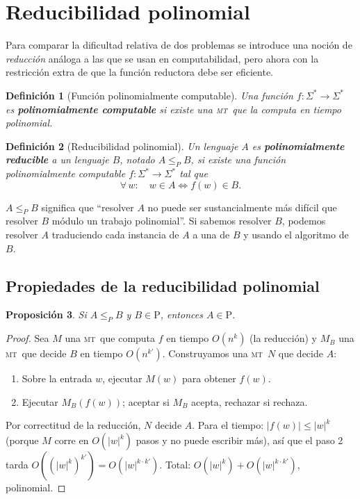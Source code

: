 \documentclass[11pt,a4paper]{article}
\theoremstyle{definicion}
\newtheorem{definicion}{Definición}[section]
\newtheorem{proposicion}[definicion]{Proposición}
\newcommand{\MT}{\textsc{mt}}
\newcommand{\redP}{\leq_{P}}
\newcommand{\Pclass}{\mathrm{P}}
\begin{document}
\section{Reducibilidad polinomial}

Para comparar la dificultad relativa de dos problemas se introduce una noción de \emph{reducción} análoga a las que se usan en computabilidad, pero ahora con la restricción extra de que la función reductora debe ser eficiente.

\begin{definicion}[Función polinomialmente computable]
Una función $f : \Sigma^* \to \Sigma^*$ es \textbf{polinomialmente computable} si existe una \MT\ que la computa en tiempo polinomial.
\end{definicion}

\begin{definicion}[Reducibilidad polinomial]
Un lenguaje $A$ es \textbf{polinomialmente reducible} a un lenguaje $B$, notado $A \redP B$, si existe una función polinomialmente computable $f : \Sigma^* \to \Sigma^*$ tal que
\[
\forall\, w : \quad w \in A \iff f(w) \in B.
\]
\end{definicion}

\begin{intuicion}
$A \redP B$ significa que ``resolver $A$ no puede ser sustancialmente más difícil que resolver $B$ módulo un trabajo polinomial''. Si sabemos resolver $B$, podemos resolver $A$ traduciendo cada instancia de $A$ a una de $B$ y usando el algoritmo de $B$.
\end{intuicion}

\subsection{Propiedades de la reducibilidad polinomial}

\begin{proposicion}\label{prop:red-P}
Si $A \redP B$ y $B \in \Pclass$, entonces $A \in \Pclass$.
\end{proposicion}

\begin{proof}
Sea $M$ una \MT\ que computa $f$ en tiempo $O(n^k)$ (la reducción) y $M_B$ una \MT\ que decide $B$ en tiempo $O(n^{k'})$. Construyamos una \MT\ $N$ que decide $A$:
\begin{enumerate}
    \item Sobre la entrada $w$, ejecutar $M(w)$ para obtener $f(w)$.
    \item Ejecutar $M_B(f(w))$; aceptar si $M_B$ acepta, rechazar si rechaza.
\end{enumerate}
Por correctitud de la reducción, $N$ decide $A$. Para el tiempo: $|f(w)| \leq |w|^k$ (porque $M$ corre en $O(|w|^k)$ pasos y no puede escribir más), así que el paso 2 tarda $O((|w|^k)^{k'}) = O(|w|^{k \cdot k'})$. Total: $O(|w|^k) + O(|w|^{k \cdot k'})$, polinomial.
\end{proof}
\end{document}
